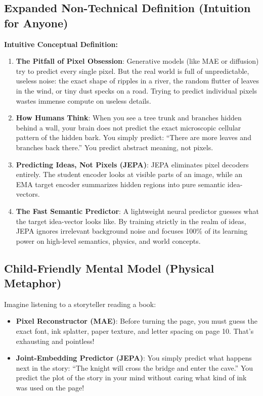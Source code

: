 \documentclass[11pt,a4paper]{article}
\theoremstyle{definition}
\begin{document}
\subsection{Expanded Non-Technical Definition (Intuition for Anyone)}
\textbf{Intuitive Conceptual Definition:}
\begin{enumerate}
    \item \textbf{The Pitfall of Pixel Obsession}: Generative models (like MAE or diffusion) try to predict every single pixel. But the real world is full of unpredictable, useless noise: the exact shape of ripples in a river, the random flutter of leaves in the wind, or tiny dust specks on a road. Trying to predict individual pixels wastes immense compute on useless details.
    \item \textbf{How Humans Think}: When you see a tree trunk and branches hidden behind a wall, your brain does not predict the exact microscopic cellular pattern of the hidden bark. You simply predict: ``There are more leaves and branches back there.'' You predict abstract meaning, not pixels.
    \item \textbf{Predicting Ideas, Not Pixels (JEPA)}: JEPA eliminates pixel decoders entirely. The student encoder looks at visible parts of an image, while an EMA target encoder summarizes hidden regions into pure semantic idea-vectors.
    \item \textbf{The Fast Semantic Predictor}: A lightweight neural predictor guesses what the target idea-vector looks like. By training strictly in the realm of ideas, JEPA ignores irrelevant background noise and focuses 100\% of its learning power on high-level semantics, physics, and world concepts.
\end{enumerate}

\subsection{Child-Friendly Mental Model (Physical Metaphor)}
Imagine listening to a storyteller reading a book:
\begin{itemize}
    \item \textbf{Pixel Reconstructor (MAE)}: Before turning the page, you must guess the exact font, ink splatter, paper texture, and letter spacing on page 10. That's exhausting and pointless!
    \item \textbf{Joint-Embedding Predictor (JEPA)}: You simply predict what happens next in the story: ``The knight will cross the bridge and enter the cave.'' You predict the plot of the story in your mind without caring what kind of ink was used on the page!
\end{itemize}
\end{document}
